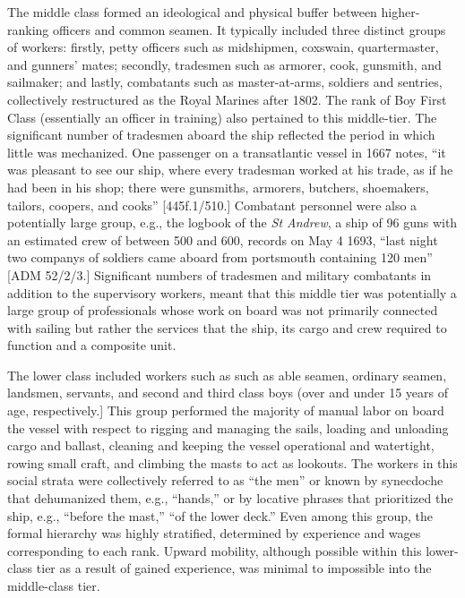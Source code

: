 The middle class formed an ideological and physical buffer between higher-ranking officers and common seamen. It typically included three distinct groups of workers: firstly, petty officers such as midshipmen, coxswain, quartermaster, and gunners’ mates; secondly, tradesmen such as armorer, cook, gunsmith, and sailmaker; and lastly, combatants such as master-at-arms, soldiers and sentries, collectively restructured as the Royal Marines after 1802. The rank of Boy First Class (essentially an officer in training) also pertained to this middle-tier.  The significant number of tradesmen aboard the ship reflected the period in which little was mechanized. One passenger on a transatlantic vessel in 1667 notes, “it was pleasant to see our ship, where every tradesman worked at his trade, as if he had been in his shop; there were gunsmiths, armorers, butchers, shoemakers, tailors, coopers, and cooks” [445f.1/510.] Combatant personnel were also a potentially large group, e.g., the logbook of the \textit{St Andrew}, a ship of 96 guns with an estimated crew of between 500 and 600, records on May 4 1693, “last night two companys of soldiers came aboard from portsmouth containing 120 men” [ADM 52/2/3.] Significant numbers of tradesmen and military combatants in addition to the supervisory workers, meant that this middle tier was potentially a large group of professionals whose work on board was not primarily connected with sailing but rather the services that the ship, its cargo and crew required to function and a composite unit.

The lower class included workers such as such as able seamen, ordinary seamen, landsmen, servants, and second and third class boys (over and under 15 years of age, respectively.] This group performed the majority of manual labor on board the vessel with respect to rigging and managing the sails, loading and unloading cargo and ballast, cleaning and keeping the vessel operational and watertight, rowing small craft, and climbing the masts to act as lookouts. The workers in this social strata were collectively referred to as “the men” or known by synecdoche that dehumanized them, e.g., “hands,” or by locative phrases that prioritized the ship, e.g., “before the mast,” “of the lower deck.” Even among this group, the formal hierarchy was highly stratified, determined by experience and wages corresponding to each rank. Upward mobility, although possible within this lower-class tier as a result of gained experience, was minimal to impossible into the middle-class tier. 

